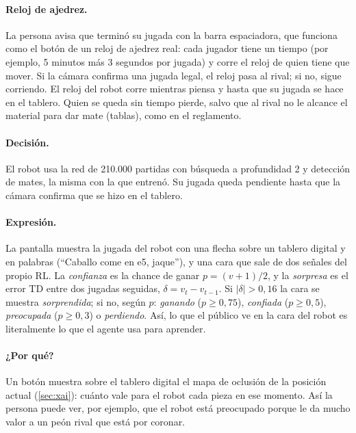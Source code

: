 \documentclass[11pt,a4paper]{article}
\begin{document}
\paragraph{Reloj de ajedrez.} La persona avisa que terminó su jugada con la
barra espaciadora, que funciona como el botón de un reloj de ajedrez real:
cada jugador tiene un tiempo (por ejemplo, 5 minutos más 3 segundos por
jugada) y corre el reloj de quien tiene que mover. Si la cámara confirma
una jugada legal, el reloj pasa al rival; si no, sigue corriendo. El reloj
del robot corre mientras piensa y hasta que su jugada se hace en el
tablero. Quien se queda sin tiempo pierde, salvo que al rival no le
alcance el material para dar mate (tablas), como en el reglamento.

\paragraph{Decisión.} El robot usa la red de 210.000 partidas con búsqueda
a profundidad 2 y detección de mates, la misma con la que entrenó. Su
jugada queda pendiente hasta que la cámara confirma que se hizo en el
tablero.

\paragraph{Expresión.} La pantalla muestra la jugada del robot con una
flecha sobre un tablero digital y en palabras (``Caballo come en e5,
jaque''), y una cara que sale de dos señales del propio RL. La
\emph{confianza} es la chance de ganar $p=(v+1)/2$, y la \emph{sorpresa} es
el error TD entre dos jugadas seguidas, $\delta=v_t-v_{t-1}$. Si
$|\delta|>0,16$ la cara se muestra \emph{sorprendida}; si no, según $p$:
\emph{ganando} ($p\ge0,75$), \emph{confiada} ($p\ge0,5$),
\emph{preocupada} ($p\ge0,3$) o \emph{perdiendo}. Así, lo que el público ve
en la cara del robot es literalmente lo que el agente usa para aprender.

\paragraph{¿Por qué?} Un botón muestra sobre el tablero digital el mapa de
oclusión de la posición actual (\cref{sec:xai}): cuánto vale para el robot
cada pieza en ese momento. Así la persona puede ver, por ejemplo, que el
robot está preocupado porque le da mucho valor a un peón rival que está por
coronar.

\end{document}
